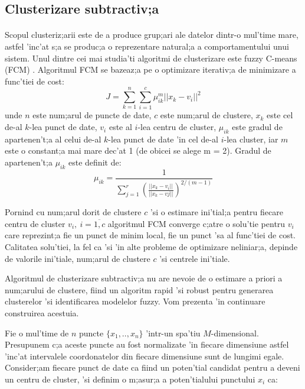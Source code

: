 \subsection{Clusterizare subtractiv;a}
\paragraph{}

Scopul clusteriz;arii este de a produce grup;ari ale datelor dintr-o mul'time mare, astfel 'inc'at s;a se produc;a o reprezentare natural;a a comportamentului unui sistem. Unul dintre cei mai studia'ti algoritmi de clusterizare este fuzzy C-means (FCM) \cite{fcmcluster}. Algoritmul FCM se bazeaz;a pe o optimizare iterativ;a de minimizare a func'tiei de cost:
\begin{equation}
J = \displaystyle \sum_{k=1}^{n} \sum_{i=1}^{c} \mu_{ik}^{m} ||x_{k} - v_{i}||^2
\end{equation}
unde $n$ este num;arul de puncte de date, $c$ este num;arul de clustere, $x_{k}$ este cel de-al $k$-lea punct de date, $v_{i}$ este al $i$-lea centru de cluster, $\mu_{ik}$ este gradul de apartenen't;a al celui de-al $k$-lea punct de date 'in cel de-al $i$-lea cluster, iar $m$ este o constant;a mai mare dec'at 1 (de obicei se alege m = 2). Gradul de apartenen't;a $\mu_{ik}$ este definit de:
\begin{equation}
\mu_{ik} = \frac {1} {\sum_{j=1}^{r} (\frac {||x_{k} - v_{i}||} {||x_{k} - v{j}||})^{2 / (m-1)}}
\end{equation}
\par
Pornind cu num;arul dorit de clustere $c$ 'si o estimare ini'tial;a pentru fiecare centru de cluster $v_{i}, \ i = \overline {1,c}$ algoritmul FCM converge c;atre o solu'tie pentru $v_{i}$ care reprezint;a fie un punct de minim local, fie un punct 'sa al func'tiei de cost. Calitatea solu'tiei, la fel ca 'si 'in alte probleme de optimizare neliniar;a, depinde de valorile ini'tiale, num;arul de clustere $c$ 'si centrele ini'tiale.
\par
Algoritmul de clusterizare subtractiv;a \cite{subclustering} nu are nevoie de o estimare a priori a num;arului de clustere, fiind un algoritm rapid 'si robust pentru generarea clusterelor 'si identificarea modelelor fuzzy. Vom prezenta 'in continuare construirea acestuia.
\par
Fie o mul'time de $n$ puncte $\{x_1, .., x_n\}$ 'intr-un spa'tiu $M$-dimensional. Presupunem c;a aceste puncte au fost normalizate 'in fiecare dimensiune astfel 'inc'at intervalele coordonatelor din fiecare dimensiune sunt de lungimi egale. Consider;am fiecare punct de date ca fiind un poten'tial candidat pentru a deveni un centru de cluster, 'si definim o m;asur;a a poten'tialului punctului $x_{i}$ ca:
